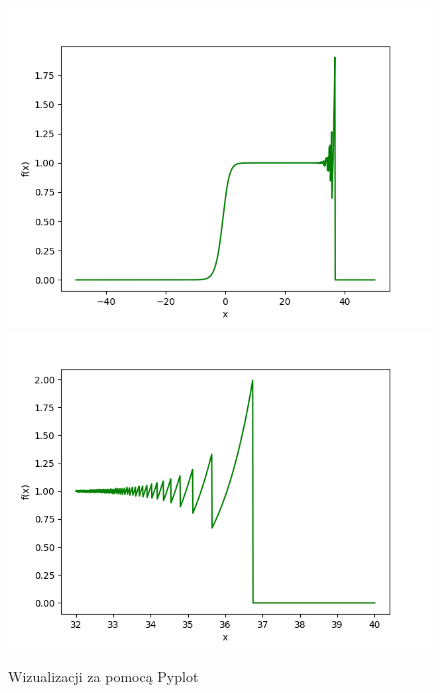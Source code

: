 \documentclass{article}
\begin{document}
\begin{figure}[h!]
    \centering
    \includegraphics[scale=0.5]{plots/f(x)-1-pyplot.png}
    \includegraphics[scale=0.5]{plots/f(x)-2-pyplot.png}
    \caption{Wizualizacji za pomocą Pyplot}
\end{figure}
\end{document}
